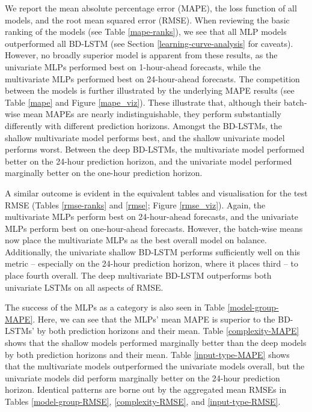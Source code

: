 \documentclass[mstat,12pt]{unswthesis}
\begin{document}
We report the mean absolute percentage error (MAPE), the loss function of all models, and the root mean squared error (RMSE). When reviewing the basic ranking of the models (see Table \ref{mape-ranks}), we see that all MLP models outperformed all BD-LSTM (see Section \ref{learning-curve-analysis} for caveats). However, no broadly superior model is apparent from these results, as the univariate MLPs performed best on 1-hour-ahead forecasts, while the multivariate MLPs performed best on 24-hour-ahead forecasts. The competition between the models is further illustrated by the underlying MAPE results (see Table \ref{mape} and Figure \ref{mape_viz}). These illustrate that, although their batch-wise mean MAPEs are nearly indistinguishable, they perform substantially differently with different prediction horizons. Amongst the BD-LSTMs, the shallow multivariate model performs best, and the shallow univariate model performs worst. Between the deep BD-LSTMs, the multivariate model performed better on the 24-hour prediction horizon, and the univariate model performed marginally better on the one-hour prediction horizon.

A similar outcome is evident in the equivalent tables and visualisation for the test RMSE (Tables \ref{rmse-ranks} and \ref{rmse}; Figure \ref{rmse_viz}). Again, the multivariate MLPs perform best on 24-hour-ahead forecasts, and the univariate MLPs perform best on one-hour-ahead forecasts. However, the batch-wise means now place the multivariate MLPs as the best overall model on balance. Additionally, the univariate shallow BD-LSTM performs sufficiently well on this metric – especially on the 24-hour prediction horizon, where it places third – to place fourth overall. The deep multivariate BD-LSTM outperforms both univariate LSTMs on all aspects of RMSE.

The success of the MLPs as a category is also seen in Table \ref{model-group-MAPE}. Here, we can see that the MLPs' mean MAPE is superior to the BD-LSTMs' by both prediction horizons and their mean. Table \ref{complexity-MAPE} shows that the shallow models performed marginally better than the deep models by both prediction horizons and their mean. Table \ref{input-type-MAPE} shows that the multivariate models outperformed the univariate models overall, but the univariate models did perform marginally better on the 24-hour prediction horizon. Identical patterns are borne out by the aggregated mean RMSEs in Tables \ref{model-group-RMSE}, \ref{complexity-RMSE}, and \ref{input-type-RMSE}.
\end{document}
